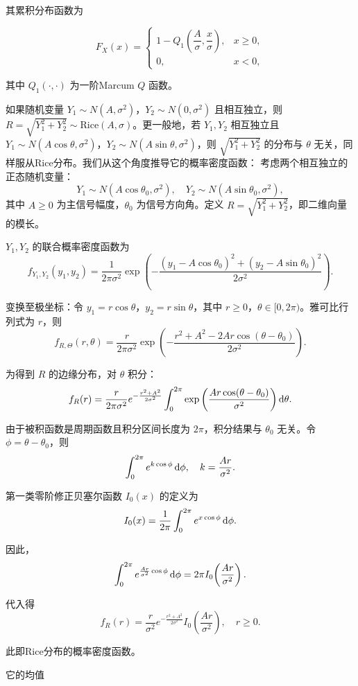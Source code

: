 其累积分布函数为

\[
F_X(x) = \begin{cases}
    1 - Q_1\!\left(\dfrac{A}{\sigma}, \dfrac{x}{\sigma}\right), & x \geq 0,\\
    0, & x < 0,
\end{cases}
\]

其中 $Q_1(\cdot, \cdot)$ 为一阶Marcum $Q$ 函数。

如果随机变量 $Y_1 \sim N(A, \sigma^2)$，$Y_2 \sim N(0, \sigma^2)$ 且相互独立，则 $R = \sqrt{Y_1^2 + Y_2^2} \sim \mathrm{Rice}(A, \sigma)$。更一般地，若 $Y_1, Y_2$ 相互独立且 $Y_1 \sim N(A\cos\theta, \sigma^2)$，$Y_2 \sim N(A\sin\theta, \sigma^2)$，则 $\sqrt{Y_1^2 + Y_2^2}$ 的分布与 $\theta$ 无关，同样服从Rice分布。我们从这个角度推导它的概率密度函数：
考虑两个相互独立的正态随机变量：
\[
Y_1 \sim N(A\cos\theta_0, \sigma^2),\quad Y_2 \sim N(A\sin\theta_0, \sigma^2),
\]
其中 $A \geq 0$ 为主信号幅度，$\theta_0$ 为信号方向角。定义 $R = \sqrt{Y_1^2 + Y_2^2}$，即二维向量的模长。

$Y_1, Y_2$ 的联合概率密度函数为
\[
f_{Y_1,Y_2}(y_1, y_2) = \frac{1}{2\pi\sigma^2} \exp\left(-\frac{(y_1 - A\cos\theta_0)^2 + (y_2 - A\sin\theta_0)^2}{2\sigma^2}\right).
\]

变换至极坐标：令 $y_1 = r\cos\theta$，$y_2 = r\sin\theta$，其中 $r \geq 0$，$\theta \in [0, 2\pi)$。雅可比行列式为 $r$，则
\[
f_{R,\Theta}(r,\theta) = \frac{r}{2\pi\sigma^2} \exp\left(-\frac{r^2 + A^2 - 2Ar\cos(\theta - \theta_0)}{2\sigma^2}\right).
\]

为得到 $R$ 的边缘分布，对 $\theta$ 积分：
\[
f_R(r) = \frac{r}{2\pi\sigma^2} e^{-\frac{r^2 + A^2}{2\sigma^2}} \int_0^{2\pi} \exp\left(\frac{Ar\cos(\theta - \theta_0)}{\sigma^2}\right) \mathop{}\!\mathrm{d}\theta.
\]

由于被积函数是周期函数且积分区间长度为 $2\pi$，积分结果与 $\theta_0$ 无关。令 $\phi = \theta - \theta_0$，则
\[
\int_0^{2\pi} e^{k\cos\phi} \mathop{}\!\mathrm{d}\phi, \quad k = \frac{Ar}{\sigma^2}.
\]

第一类零阶修正贝塞尔函数 $I_0(x)$ 的定义为
\[
I_0(x) = \frac{1}{2\pi} \int_0^{2\pi} e^{x\cos\phi} \mathop{}\!\mathrm{d}\phi.
\]

因此，
\[
\int_0^{2\pi} e^{\frac{Ar}{\sigma^2}\cos\phi} \mathop{}\!\mathrm{d}\phi = 2\pi I_0\!\left(\frac{Ar}{\sigma^2}\right).
\]

代入得
\[
f_R(r) = \frac{r}{\sigma^2} e^{-\frac{r^2 + A^2}{2\sigma^2}} I_0\!\left(\frac{Ar}{\sigma^2}\right), \quad r \geq 0.
\]

此即Rice分布的概率密度函数。

它的均值


